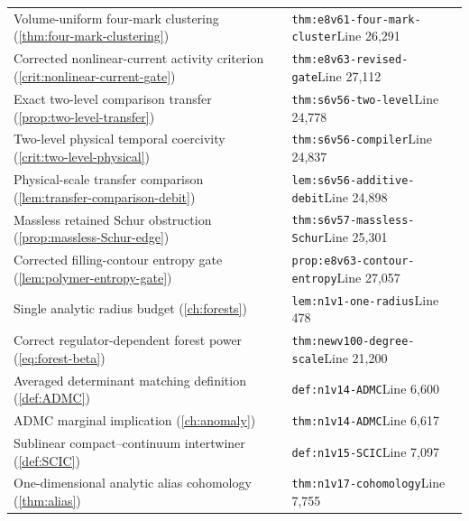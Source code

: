 \documentclass[11pt,oneside,openany]{book}
\theoremstyle{definition}
\theoremstyle{remark}
\begin{document}
\begin{longtable}{L{0.32\textwidth}L{0.12\textwidth}L{0.477\textwidth}}
Volume-uniform four-mark clustering (\cref{thm:four-mark-clustering}) & \cite{F8} & \nolinkurl{thm:e8v61-four-mark-cluster}\newline Line 26,291 \\
Corrected nonlinear-current activity criterion (\cref{crit:nonlinear-current-gate}) & \cite{F8} & \nolinkurl{thm:e8v63-revised-gate}\newline Line 27,112 \\
Exact two-level comparison transfer (\cref{prop:two-level-transfer}) & \cite{F6} & \nolinkurl{thm:s6v56-two-level}\newline Line 24,778 \\
Two-level physical temporal coercivity (\cref{crit:two-level-physical}) & \cite{F6} & \nolinkurl{thm:s6v56-compiler}\newline Line 24,837 \\
Physical-scale transfer comparison (\cref{lem:transfer-comparison-debit}) & \cite{F6} & \nolinkurl{lem:s6v56-additive-debit}\newline Line 24,898 \\
Massless retained Schur obstruction (\cref{prop:massless-Schur-edge}) & \cite{F6} & \nolinkurl{thm:s6v57-massless-Schur}\newline Line 25,301 \\
Corrected filling-contour entropy gate (\cref{lem:polymer-entropy-gate}) & \cite{F8} & \nolinkurl{prop:e8v63-contour-entropy}\newline Line 27,057 \\
Single analytic radius budget (\cref{ch:forests}) & \cite{F9} & \nolinkurl{lem:n1v1-one-radius}\newline Line 478 \\
Correct regulator-dependent forest power (\cref{eq:forest-beta}) & \cite{F10} & \nolinkurl{thm:newv100-degree-scale}\newline Line 21,200 \\
Averaged determinant matching definition (\cref{def:ADMC}) & \cite{F9} & \nolinkurl{def:n1v14-ADMC}\newline Line 6,600 \\
ADMC marginal implication (\cref{ch:anomaly}) & \cite{F9} & \nolinkurl{thm:n1v14-ADMC}\newline Line 6,617 \\
Sublinear compact--continuum intertwiner (\cref{def:SCIC}) & \cite{F9} & \nolinkurl{def:n1v15-SCIC}\newline Line 7,097 \\
One-dimensional analytic alias cohomology (\cref{thm:alias}) & \cite{F9} & \nolinkurl{thm:n1v17-cohomology}\newline Line 7,755 \\

\end{longtable}
\end{document}
